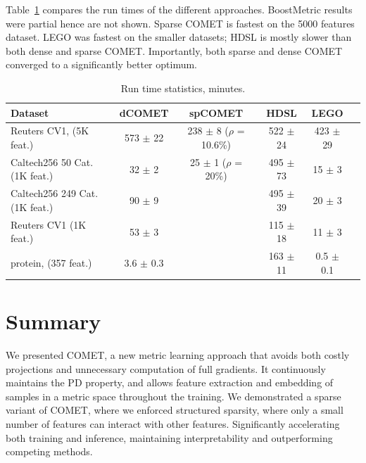 \documentclass[twoside,11pt]{article}
\newcommand{\tabref}[1]{Table~\ref{#1}}
\begin{document}
\tabref{runtimes} compares the run times of the different approaches. BoostMetric results were partial hence are not shown. Sparse COMET is fastest on the 5000 features dataset. LEGO was fastest on the smaller datasets; HDSL is mostly slower than both dense and sparse COMET. Importantly, both sparse and dense COMET converged to a significantly better optimum.


\begin{table}[t]
\captionsetup{font=small}
\caption{Run time statistics, minutes.}
\label{runtimes}
\vskip 0.15in
\begin{center}
\begin{small}
\begin{sc}
\begin{tabular}{lccccr}
\hline
Dataset     & dCOMET           & spCOMET            & HDSL             & LEGO            \\ 
\hline
Reuters CV1, (5K feat.)&  573 $\pm$    22 &   238 $\pm$    8 ($\rho$ = 10.6\%) &522 $\pm$    24 &   423 $\pm$    29 & \\ 
Caltech256 50 Cat. (1K feat.)  &    32 $\pm$     2 &        25 $\pm$  1 ($\rho$ = 20\%)     &   495 $\pm$    73 &     15 $\pm$     3 &\\ 
Caltech256 249 Cat. (1K feat.) &   90 $\pm$     9 &                  &  495 $\pm$    39  &     20 $\pm$     3 &\\
Reuters CV1 (1K feat.) &   53 $\pm$     3 &                  &   115 $\pm$    18 &     11 $\pm$     3 &\\ 
protein, (357 feat.)  &    3.6 $\pm$     0.3 &                  &   163 $\pm$    11 &      0.5 $\pm$     0.1 &\\ 
\hline
\end{tabular}
\end{sc}
\end{small}
\end{center}
\vskip -0.1in
\end{table}

\section{Summary}\vskip -5pt
We presented COMET, a new metric learning approach that avoids both costly projections and unnecessary computation of full gradients. It continuously maintains the PD property, and allows feature extraction and embedding of samples in a metric space throughout the training. We demonstrated a sparse variant of COMET, where we enforced structured sparsity, where only a small number of features can interact with other features. Significantly accelerating both training and inference, maintaining interpretability and outperforming competing methods.
\end{document}
